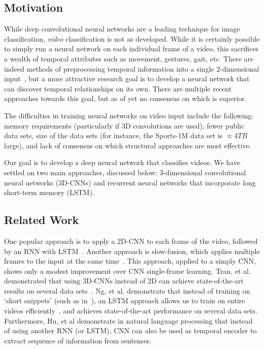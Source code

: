 \subsection*{Motivation}
While deep convolutional neural networks are a leading technique for image classification, \emph{video} classification is not as developed.
While it is certainly possible to simply run a neural network on each individual frame of a video, this sacrifices a wealth of temporal attributes such as movement, gestures, gait, etc.
There are indeed methods of preprocessing temporal information into a single 2-dimensional input~\cite{brox}, but a more attractive research goal is to develop a neural network that can discover temporal relationships on its own.
There are multiple recent approaches towards this goal, but as of yet no consensus on which is superior.

The difficulties in training neural networks on video input include the following: memory requirements (particularly if 3D convolutions are used), fewer public data sets, size of the data sets (for instance, the Sports-1M data set is $\approx 4TB$ large), and lack of consensus on which structural approaches are most effective. 

Our goal is to develop a deep neural network that classifies videos.
We have settled on two main approaches, discussed below: 3-dimensional convolutional neural networks (3D-CNNs) and recurrent neural networks that incorporate long short-term memory (LSTM).  

\subsection*{Related Work}

One popular approach is to apply a 2D-CNN to each frame of the video, followed by an RNN with LSTM~\cite{ltrcn}. 
Another approach is slow-fusion, which applies multiple frames to the input at the same time~\cite{cnnvid}. This approach, applied to a simply CNN, shows only a modest improvement over CNN single-frame learning.
Tran, et al. demonstrated that using 3D-CNNs instead of 2D can achieve state-of-the-art results on several data sets~\cite{stf}.
Ng, et al. demonstrate that instead of training on `short snippets' (such as in~\cite{cnnvid,stf}), an LSTM approach allows us to train on entire videos efficiently~\cite{snip}, and achieves state-of-the-art performance on several data sets. Furthermore, Hu, et al \cite{cnnMNLS} demonstrate in natural language processing that instead of using another RNN (or LSTM), CNN can also be used as temporal encoder to extract sequence of information from sentenses. 

